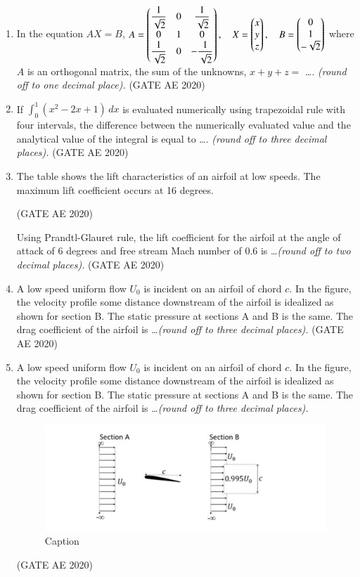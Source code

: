 \documentclass[journal,12pt,onecolumn]{IEEEtran}
\theoremstyle{remark}
\begin{document}
\begin{enumerate}
\item In the equation $AX = B$, 
$
A = \begin{pmatrix}
\dfrac{1}{\sqrt{2}} & 0 & \dfrac{1}{\sqrt{2}} \\
0 & 1 & 0 \\
\dfrac{1}{\sqrt{2}} & 0 & -\dfrac{1}{\sqrt{2}}
\end{pmatrix},
\quad
X = \begin{pmatrix}
x \\
y \\
z
\end{pmatrix},
\quad
B = \begin{pmatrix}
0 \\
1 \\
-\sqrt{2}
\end{pmatrix}
$
where $A$ is an orthogonal matrix, the sum of the unknowns, $x + y + z =$ \dots. \textit{(round off to one decimal place).}
\hfill(GATE AE 2020)

\item If $\int_{0}^{1} (x^2 - 2x + 1)\, dx$ is evaluated numerically using trapezoidal rule with four intervals, the difference between the numerically evaluated value and the analytical value of the integral is equal to \dots. \textit{ (round off to three decimal places).}
\hfill(GATE AE 2020)

\item The table shows the lift characteristics of an airfoil at low speeds. The maximum lift coefficient occurs at 16 degrees.


\hfill(GATE AE 2020)

Using Prandtl-Glauret rule, the lift coefficient for the airfoil at the angle of attack of 6 degrees and free stream Mach number of 0.6 is \dots \textit{(round off to two decimal places).}
\hfill(GATE AE 2020)

\item A low speed uniform flow $U_0$ is incident on an airfoil of chord $c$. In the figure, the velocity profile some distance downstream of the airfoil is idealized as shown for section B. The static pressure at sections A and B is the same. The drag coefficient of the airfoil is \dots \textit{(round off to three decimal places).}
\hfill(GATE AE 2020)

\item A low speed uniform flow $U_0$ is incident on an airfoil of chord $c$. In the figure, the velocity profile some distance downstream of the airfoil is idealized as shown for section B. The static pressure at sections A and B is the same. The drag coefficient of the airfoil is \dots \textit{(round off to three decimal places).}

\begin{figure}[H]
    \centering
    \includegraphics[width=0.5\columnwidth]{figs/Screenshot from 2025-08-19 15-56-20.png}
    \caption{Caption}
    \label{fig:placeholder}
\end{figure}
\hfill(GATE AE 2020)


\end{enumerate}
\end{document}
